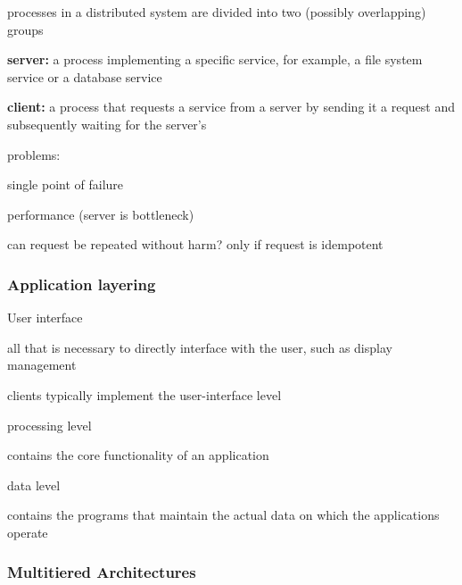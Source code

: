 \documentclass[ngerman,a4paper]{report}
\begin{document}
\begin{compactitem}
	\item processes in a distributed system are divided into two (possibly overlapping) groups
	\item \textbf{server:} a process implementing a specific service, for example, a file system service or a database service
	\item \textbf{client:} a process that requests a service from a server by sending it a request and subsequently waiting for the server's 
	\item problems:
	\begin{compactitem}
		\item single point of failure
		\item performance (server is bottleneck)
		\item can request be repeated without harm? only if request is idempotent
	\end{compactitem}
\end{compactitem}

\subsubsection{Application layering}

\begin{compactenum}
	\item User interface
	\begin{compactitem}
		\item all that is necessary to directly interface with the user, such as display management
		\item clients typically implement the user-interface level
	\end{compactitem}
	\item processing level
	\begin{compactitem}
		\item contains the core functionality of an application
	\end{compactitem}	
	\item data level
	\begin{compactitem}
		\item contains the programs that maintain the actual data on which the applications operate
	\end{compactitem}	
\end{compactenum}

\subsubsection{Multitiered Architectures}
\end{document}
